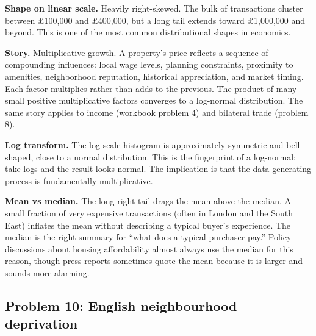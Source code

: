 \documentclass[
  letterpaper,
  11pt,
  twoside,
  openany]{scrbook}
\begin{document}
\begin{tcolorbox}[enhanced jigsaw, arc=.35mm, bottomrule=.15mm, bottomtitle=1mm, breakable, colback=white, colbacktitle=quarto-callout-note-color!10!white, colframe=quarto-callout-note-color-frame, coltitle=black, left=2mm, leftrule=.75mm, opacityback=0, opacitybacktitle=0.6, rightrule=.15mm, title=\textcolor{quarto-callout-note-color}{\faInfo}\hspace{0.5em}{Solution to Problem 9}, titlerule=0mm, toprule=.15mm, toptitle=1mm]

\textbf{Shape on linear scale.} Heavily right-skewed. The bulk of
transactions cluster between £100,000 and £400,000, but a long tail
extends toward £1,000,000 and beyond. This is one of the most common
distributional shapes in economics.

\textbf{Story.} Multiplicative growth. A property's price reflects a
sequence of compounding influences: local wage levels, planning
constraints, proximity to amenities, neighborhood reputation, historical
appreciation, and market timing. Each factor multiplies rather than adds
to the previous. The product of many small positive multiplicative
factors converges to a log-normal distribution. The same story applies
to income (workbook problem 4) and bilateral trade (problem 8).

\textbf{Log transform.} The log-scale histogram is approximately
symmetric and bell-shaped, close to a normal distribution. This is the
fingerprint of a log-normal: take logs and the result looks normal. The
implication is that the data-generating process is fundamentally
multiplicative.

\textbf{Mean vs median.} The long right tail drags the mean above the
median. A small fraction of very expensive transactions (often in London
and the South East) inflates the mean without describing a typical
buyer's experience. The median is the right summary for ``what does a
typical purchaser pay.'' Policy discussions about housing affordability
almost always use the median for this reason, though press reports
sometimes quote the mean because it is larger and sounds more alarming.

\end{tcolorbox}

\subsection{Problem 10: English neighbourhood
deprivation}\label{problem-10-english-neighbourhood-deprivation}
\end{document}
